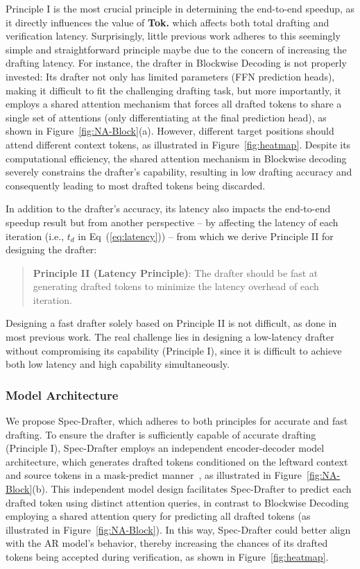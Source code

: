 Principle I is the most crucial principle in determining the end-to-end speedup, as it directly influences the value of \textbf{Tok.} which affects both total drafting and verification latency. Surprisingly, little previous work adheres to this seemingly simple and straightforward principle maybe due to the concern of increasing the drafting latency. For instance, the drafter in Blockwise Decoding is not properly invested: Its drafter not only has limited parameters (FFN prediction heads), making it difficult to fit the challenging drafting task, but more importantly, it employs a shared attention mechanism that forces all drafted tokens to share a single set of attentions (only differentiating at the final prediction head), as shown in Figure~\ref{fig:NA-Block}(a). However, different target positions should attend different context tokens, as illustrated in Figure~\ref{fig:heatmap}. Despite its computational efficiency, the shared attention mechanism in Blockwise decoding severely constrains the drafter's capability, resulting in low drafting accuracy and consequently leading to most drafted tokens being discarded.  

In addition to the drafter's accuracy, its latency also impacts the end-to-end speedup result but from another perspective -- by affecting the latency of each iteration (i.e., $t_d$ in Eq~(\ref{eq:latency})) -- from which we derive Principle II for designing the drafter:

\begin{quote}
    \textbf{Principle II (Latency Principle)}: The drafter should be fast at generating drafted tokens to minimize the latency overhead of each iteration.
\end{quote}

Designing a fast drafter solely based on Principle II is not difficult, as done in most previous work. The real challenge lies in designing a low-latency drafter without compromising its capability (Principle I), since it is difficult to achieve both low latency and high capability simultaneously.

\subsubsection{Model Architecture} We propose Spec-Drafter, which adheres to both principles for accurate and fast drafting. To ensure the drafter is sufficiently capable of accurate drafting (Principle I), Spec-Drafter employs an independent encoder-decoder model architecture, which generates drafted tokens conditioned on the leftward context and source tokens in a mask-predict manner~\cite{Ghazvininejad:2019}, as illustrated in Figure~\ref{fig:NA-Block}(b). This independent model design facilitates Spec-Drafter to predict each drafted token using distinct attention queries, in contrast to Blockwise Decoding employing a shared attention query for predicting all drafted tokens (as illustrated in Figure~\ref{fig:NA-Block}). In this way, Spec-Drafter could better align with the AR model's behavior, thereby increasing the chances of its drafted tokens being accepted during verification, as shown in Figure~\ref{fig:heatmap}. 

